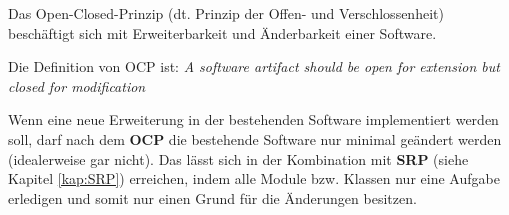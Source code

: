 Das Open-Closed-Prinzip (dt. Prinzip der Offen- und Verschlossenheit) beschäftigt sich 
mit Erweiterbarkeit und Änderbarkeit einer Software.

Die Definition von OCP ist:
\textit{A software artifact should be open for extension but 
closed for modification}\cite[70]{cleanArchitecture}

Wenn eine neue Erweiterung in der bestehenden Software implementiert werden soll, 
darf nach dem \textbf{OCP} die bestehende Software nur minimal geändert werden 
(idealerweise gar nicht). Das lässt sich in der Kombination mit \textbf{SRP} (siehe Kapitel \ref{kap:SRP})
erreichen, indem alle Module bzw. Klassen nur eine Aufgabe erledigen und somit 
nur einen Grund für die Änderungen besitzen.

